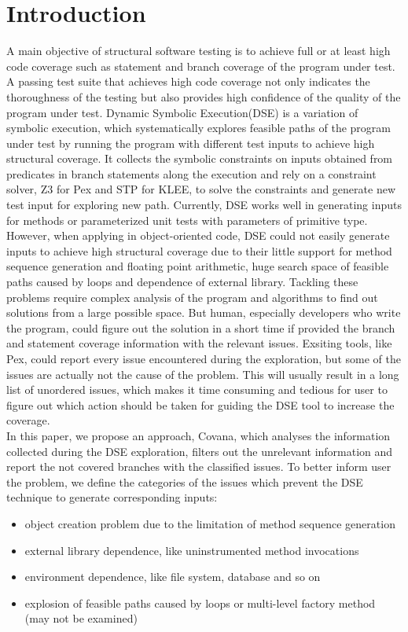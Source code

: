 \section{Introduction}
A main objective of structural software testing is to achieve full or at least high code coverage such as statement and branch coverage of the program under test. A passing test suite that achieves high code coverage not only indicates the thoroughness of the testing but also provides high confidence of the quality of the program under test. Dynamic Symbolic Execution(DSE)\cite{CadarGPDE06,GodefroidKS05,SenMA05} is a variation of symbolic execution, which systematically explores feasible paths of the program under test by running the program with different test inputs to achieve high structural coverage. It collects the symbolic constraints on inputs obtained from predicates in branch statements along the execution and rely on a constraint solver, Z3 for Pex\cite{TillmannH08} and STP\cite{stp} for KLEE\cite{klee}, to solve the constraints and generate new test input for exploring new path. Currently, DSE works well in generating inputs for methods or parameterized unit tests with parameters of primitive type. However, when applying in object-oriented code, DSE could not easily generate inputs to achieve high structural coverage due to their little support for method sequence generation and floating point arithmetic, huge search space of feasible paths caused by loops and dependence of external library. Tackling these problems require complex analysis of the program and algorithms to find out solutions from a large possible space. But human, especially developers who write the program, could figure out the solution in a short time if provided the branch and statement coverage information with the relevant issues. Exsiting tools, like Pex, could report every issue encountered during the exploration, but some of the issues are actually not the cause of the problem. This will usually result in a long list of unordered issues, which makes it time consuming and tedious for user to figure out which action should be taken for guiding the DSE tool to increase the coverage.
\\In this paper, we propose an approach, Covana, which analyses the information collected during the DSE exploration, filters out the unrelevant information and report the not covered branches with the classified issues. To better inform user the problem, we define the categories of the issues which prevent the DSE technique to generate corresponding inputs:
\begin{itemize}
	\item object creation problem due to the limitation of method sequence generation 
	\item external library dependence, like uninstrumented method invocations
	\item environment dependence, like file system, database and so on
	\item explosion of feasible paths caused by loops or multi-level factory method (may not be examined)
\end{itemize}

